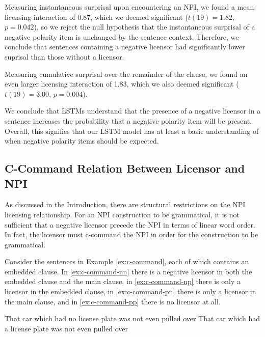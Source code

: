 \documentclass[11pt, round]{article}
\begin{document}
Measuring instantaneous surprisal upon encountering an NPI, we found a mean licensing interaction of 0.87, which we deemed significant ($t(19) = 1.82$, $p = 0.042$), so we reject the null hypothesis that the instantaneous surprisal of a negative polarity item is unchanged by the sentence context. Therefore, we conclude that sentences containing a negative licensor had significantly lower suprisal than those without a licensor.

Measuring cumulative surprisal over the remainder of the clause, we found an even larger licensing interaction of 1.83, which we also deemed significant ($t(19) = 3.00$, $p = 0.004$).

We conclude that LSTMs understand that the presence of a negative licensor in a sentence increases the probability that a negative polarity item will be present. Overall, this signifies that our LSTM model has at least a basic understanding of when negative polarity items should be expected.

\subsection{C-Command Relation Between Licensor and NPI}
\label{sec:c-command}

As discussed in the Introduction, there are structural restrictions on the NPI licensing relationship. For an NPI construction to be grammatical, it is not sufficient that a negative licensor precede the NPI in terms of linear word order. In fact, the licensor must c-command the NPI in order for the construction to be grammatical.

Consider the sentences in Example \ref{ex:c-command}, each of which contains an embedded clause. In \ref{ex:c-command-nn} there is a negative licensor in both the embedded clause and the main clause, in \ref{ex:c-command-np} there is only a licensor in the embedded clause, in \ref{ex:c-command-pn} there is only a licensor in the main clause, and in \ref{ex:c-command-pp} there is no licensor at all.

\begin{exe}
\ex
\label{ex:c-command}
\begin{xlist}
\ex \label{ex:c-command-nn} That car which had no license plate was not even pulled over
\ex \label{ex:c-command-pn} That car which had a license plate was not even pulled over
\end{xlist}
\end{exe}
\end{document}
